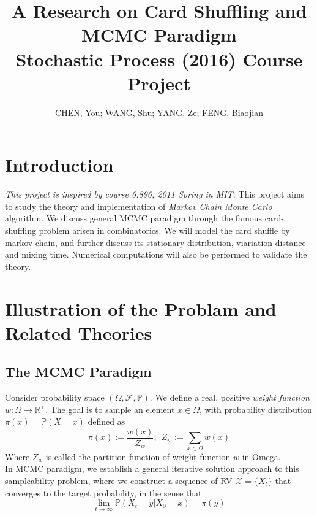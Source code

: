 \documentclass[a4paper, 11pt]{article}
\title{\textbf{A Research on Card Shuffling and MCMC Paradigm} \\ Stochastic Process (2016) Course Project}
\author{CHEN, You; WANG, Shu; YANG, Ze; FENG, Biaojian}
\theoremstyle{definition}
\begin{document}
\maketitle
\section{Introduction}
\textit{This project is inspired by course 6.896, 2011 Spring in MIT.}\cite{mit} 
This project aims to study the theory and implementation of \textit{Markov Chain Monte Carlo} algorithm. We discuss general MCMC paradigm through the famous card-shuffling problem arisen in combinatorics. We will model the card shuffle by markov chain, and further discuss its stationary distribution, viariation distance and mixing time. Numerical computations will also be performed to validate the theory.

\section{Illustration of the Problam and Related Theories}
\subsection{The MCMC Paradigm} 
Consider probability space $(\Omega, \mathcal{F}, \mathbb{P})$. We define a real, positive \textit{weight function} $w:\Omega \to \mathbb{R}^+$. The goal is to sample an element $x\in\Omega$, with probability distribution $\pi(x)=\mathbb{P}\left(X=x\right)$ defined as
$$\pi(x):=\frac{w(x)}{Z_w};~~Z_w:=\sum_{x\in\Omega}w(x)$$
Where $Z_w$ is called the partition function of weight function $w$ in Omega. \\
In MCMC paradigm, we establish a general iterative solution approach to this sampleability problem, where we construct a sequence of RV $\mathcal{X}=\{X_t\}$ that converges to the target probability, in the sense that
$$
\lim\limits_{t\to \infty} \mathbb{P}\left(X_t=y|X_0=x\right) = \pi(y)
$$
\end{document}
